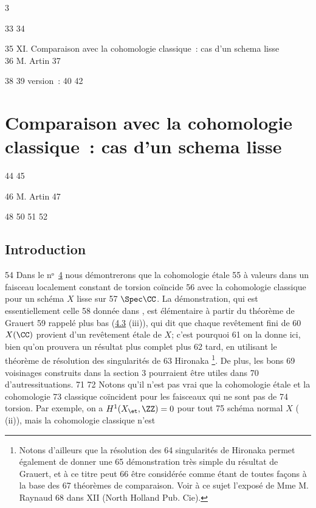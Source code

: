 3	\documentclass[10pt]{../fichiers-configuration-latex/smfart}
\begin{document}
    33	
    34	\begin{center}
    35	XI. Comparaison avec la cohomologie classique : cas d'un schema lisse\\
    36	M. Artin 
    37	\end{center}
    38	
    39	version : \showgitstatus{}
    40		
    42		\chapter{Comparaison avec la cohomologie classique : cas d'un schema lisse}
    44	%
    45	\begin{center}
    46	M. Artin 
    47	\end{center}
    48		
    50	\setcounter{pageoriginal}{63}
    51	
    52	\section{Introduction}	
    54	Dans le nᵒ \hyperref[XI.sec4]{4} nous démontrerons que la cohomologie étale
    55	à valeurs dans un faisceau localement constant de torsion coïncide
    56	avec la cohomologie classique pour un schéma $X$ lisse sur
    57	$\Spec\CC$. La démonstration, qui est essentiellement celle
    58	donnée dans \cite{1}, est élémentaire à partir du théorème de Grauert
    59	rappelé plus bas (\hyperref[XI.thm4.3]{4.3} (iii)), qui dit que chaque revêtement fini de
    60	$X(\CC)$ provient d'un revêtement étale de $X$; c'est pourquoi
    61	on la donne ici, bien qu'on prouvera un résultat plus complet plus
    62	tard, en utilisant le théorème de résolution des singularités de
    63	Hironaka \cite{3} \footnote[1]{Notons d'ailleurs que la résolution des
    64	  singularités de Hironaka permet également de donner une
    65	  démonstration très simple du résultat de Grauert, et à ce titre peut
    66	être considérée comme étant de toutes façons à la base des
    67	théorèmes de comparaison. Voir à ce sujet l'exposé de Mme M. Raynaud
    68	dans  XII (North Holland Pub. Cie).}. De plus, les bons
    69	voisinages  construits dans la section 3 pourraient être utiles dans
    70	d'autres\pageoriginale situations.
    71	
    72	Notons qu'il n'est pas vrai que la cohomologie étale et la cohomologie
    73	classique coïncident pour les faisceaux qui ne sont pas de
    74	torsion. Par exemple, on a $H^1(X_{\et},\ZZ)=0$ pour tout
    75	schéma normal $X$ ( (ii)), mais la cohomologie classique n'est
\end{document}
